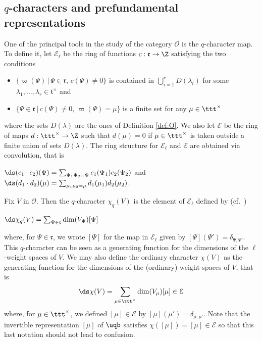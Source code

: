 \documentclass[11pt]{amsart}
\theoremstyle{definition}
\theoremstyle{remark}
\numberwithin{equation}{section}
\begin{document}
\subsection{$q$-characters and prefundamental representations}\label{sec:qcaract} One of the principal tools in the study of the category $\mathcal{O}$ is the $q$-character map. To define it, let $\mathcal{E}_{\ell}$ be the ring of functions $c:\mathfrak{r}\rightarrow\Z$ satisfying the two conditions
\begin{itemize}
\item[(i)] $\{\varpi(\Psi)\,|\,\Psi\in \mathfrak{r},\, c(\Psi)\neq 0\}$ is contained in $\bigcup_{i=1}^r D(\lambda_i)$ for some $\lambda_1,\dots ,\lambda_r\in \mathfrak{t}^{\times}$ and
\item[(ii)] $\{\Psi\in \mathfrak{r}\,|\, c(\Psi)\neq 0,\, \varpi(\Psi)=\mu\}$ is a finite set for any $\mu \in \ttt^{\times}$
\end{itemize}
where the sets $D(\lambda)$ are the ones of Definition \ref{def:O}. We also let $\mathcal{E}$ be the ring of maps $d:\ttt^{\times}\rightarrow \Z$ such that $d(\mu) = 0$ if $\mu \in \ttt^{\times}$ is taken outside a finite union of sets $D(\lambda)$.  The ring structure for $\mathcal{E}_{\ell}$ and $\mathcal{E}$ are obtained via convolution, that is
\begin{center}
$\ds (c_1\cdot c_2)(\Psi) = \sum_{\Psi_1\Psi_2 = \Psi} c_1(\Psi_1)c_2(\Psi_2)$ and $\ds (d_1\cdot d_2)(\mu) = \sum_{\mu_1\mu_2 = \mu} d_1(\mu_1)d_2(\mu_2)$.
\end{center}
Fix $V$ in $\mathcal{O}$. Then the $q$-character $\chi_q(V)$ is the element of $\mathcal{E}_{\ell}$ defined by (cf.~\cite{fr,hj})
\begin{center}
$\ds \chi_q(V)= \sum_{\Psi\in \mathfrak{r}} \dim (V_{\Psi})[\Psi]$
\end{center}
where, for $\Psi \in \mathfrak{r}$, we wrote $[\Psi]$ for the map in $\mathcal{E}_{\ell}$ 
given by $[\Psi](\Psi') = \delta_{\Psi,\Psi'}$. This $q$-character can be seen as a generating function for the dimensions of the $\ell$-weight spaces of $V$. We may also define the ordinary character $\chi(V)$ as the generating function for the dimensions of the (ordinary) weight spaces of $V$, that is
$$\ds \chi(V)= \sum_{\mu \in \ttt^{\times}} \dim (V_{\mu}) [\mu]\in\mathcal{E}$$
where, for $\mu \in \ttt^{\times}$, we defined $[\mu]\in \mathcal{E}$ by $[\mu](\mu') = \delta_{\mu,\mu'}$. Note that the invertible representation $[\mu]$ of $\uqb$ satisfies $\chi([\mu]) = [\mu]\in \mathcal{E}$ so that this last notation should not lead to confusion.\par
\end{document}
